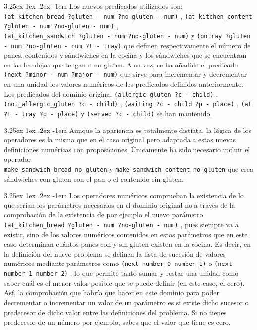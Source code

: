 \documentclass{article}
\makeatletter
\newcommand{\cool}[1] {
        {\texttt{#1}}
    }
\renewcommand\paragraph{\@startsection{paragraph}{5}{\z@}%
      {3.25ex \@plus1ex \@minus.2ex}%
      {-1em}%
      {\normalfont\normalsize\bfseries}}
\makeatother
\begin{document}
    \paragraph{}
    Los nuevos predicados utilizados son: \\ \cool{(at\_kitchen\_bread ?gluten - num ?no-gluten - num)},  \cool{(at\_kitchen\_content ?gluten - num ?no-gluten - num)}, \\ \cool{(at\_kitchen\_sandwich ?gluten - num ?no-gluten - num)} y \cool{(ontray ?gluten - num ?no-gluten - num ?t - tray)} que definen respectivamente el número de panes, contenidos y sándwiches en la cocina y los sándwiches que se encuentran en las bandejas que tengan o no gluten. A su vez, se ha añadido el predicado \cool{(next ?minor - num ?major - num)} que sirve para incrementar y decrementar en una unidad los valores numéricos de los predicados definidos anteriormente. Los predicados del dominio original \cool{(allergic\_gluten ?c - child)}, \cool{(not\_allergic\_gluten ?c - child)}, \cool{(waiting ?c - child ?p - place)}, \cool{(at ?t - tray ?p - place)} y \cool{(served ?c - child)} se han mantenido.
    
    \paragraph{}
    Aunque la apariencia es totalmente distinta, la lógica de los operadores es la misma que en el caso original pero adaptada a estas nuevas definiciones numéricas con proposiciones. Únicamente ha sido necesario incluir el operador \\ \cool{make\_sandwich\_bread\_no\_gluten} y \cool{make\_sandwich\_content\_no\_gluten} que crea sándwiches con gluten con el pan o el contenido sin gluten.
    
    \paragraph{}
    Los operadores numéricos comprueban la existencia de lo que serían los parámetros necesarios en el dominio original no a través de la comprobación de la existencia de por ejemplo el nuevo parámetro \cool{(at\_kitchen\_bread ?gluten - num ?no-gluten - num)}, pues siempre va a existir, sino de los valores numéricos contenidos en estos parámetros que en este caso determinan cuántos panes con y sin gluten existen en la cocina. Es decir, en la definición del nuevo problema se definen la lista de sucesión de valores numéricos mediante parámetros como \cool{(next number\_0 number\_1)} o \cool{(next number\_1 number\_2)}, lo que permite tanto sumar y restar una unidad como saber cuál es el menor valor posible que se puede definir (en este caso, el cero). Así, la comprobación que habría que hacer en este dominio para poder decrementar o incrementar un valor de un parámetro es si existe dicho sucesor o predecesor de dicho valor entre las definiciones del problema. Si no tienes predecesor de un número por ejemplo, sabes que el valor que tiene es cero.
    
\end{document}
